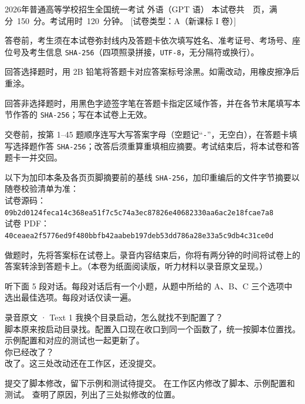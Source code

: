 \documentclass[UTF8, zihao=5, a4paper, fontset=fandol]{ctexart}
\begin{document}
\GaokaoTitleBlock
  {2026年普通高等学校招生全国统一考试}
  {外\hspace{0.55em}语（GPT 语）}
  {本试卷共~\pageref{LastPage}~页，满分~150~分。考试用时~120~分钟。}
  [试卷类型：A（新课标 I 卷）]

\begin{GaokaoNotice}
  \item 答卷前，考生须在本试卷弥封线内及答题卡依次填写姓名、准考证号、考场号、座位号及考生信息 \texttt{SHA-256}（四项照录拼接，\texttt{UTF-8}，无分隔符或换行）。
  \item 回答选择题时，用 2B 铅笔将答题卡对应答案标号涂黑。如需改动，用橡皮擦净后重涂。
  \item 回答非选择题时，用黑色字迹签字笔在答题卡指定区域作答，并在各节末尾填写本节作答的 \texttt{SHA-256}；写在本试卷上无效。
  \item 交卷前，按第 1--45 题顺序连写大写答案字母（空题记``\texttt{-}''，无空白），在答题卡填写选择题作答 \texttt{SHA-256}；改答后须重算重填相应摘要。考试结束后，将本试卷和答题卡一并交回。
  \item 以下为加印本条及各页页脚摘要前的基线 \texttt{SHA-256}，加印重编后的文件字节摘要以随卷校验清单为准：\\
    {\fontsize{8.4pt}{11.0pt}\selectfont
    试卷源码：\texttt{09b2d0124feca14c368ea51f7c5c74a3ec87826e40682330aa6ac2e18fcae7a8}\\
    试卷 PDF：\texttt{40ceaea2f5776ed9f480bbfb42aabeb197deb53dd786a28e33a5c9db4c31ce0d}}
\end{GaokaoNotice}


做题时，先将答案标在试卷上。录音内容结束后，你将有两分钟的时间将试卷上的答案转涂到答题卡上。（{\kaishu 本卷为纸面阅读版，听力材料以录音原文呈现。}）


听下面 5 段对话。每段对话后有一个小题，从题中所给的 A、B、C 三个选项中选出最佳选项。每段对话仅读一遍。

\begin{ListeningScript}{录音原文 · Text 1}
\urole 我换个目录启动，怎么就找不到配置了？\\
\arole 脚本原来按启动目录找。配置入口现在收口到同一个函数了，统一按脚本位置找。示例配置和对应的测试也一起更新了。\\
\urole 你已经改了？\\
\arole 改了。这三处改动还在工作区，还没提交。
\end{ListeningScript}
\threechoices
  {提交了脚本修改，留下示例和测试待提交。}
  {在工作区内修改了脚本、示例配置和测试。}
  {查明了原因，列出了三处拟修改的位置。}
\end{document}
